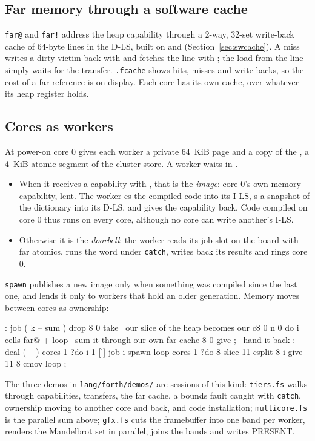 \subsection{Far memory through a software cache}
\texttt{far@} and \texttt{far!} address the heap capability through a 2-way, 32-set write-back cache of
64-byte lines in the D-LS, built on  and  (Section~\ref{sec:swcache}). A miss
writes a dirty victim back with  and fetches the line with ; the load from the
line simply waits for the transfer. \texttt{.fcache} shows hits, misses and write-backs, so the cost of
a far reference is on display. Each core has its own cache, over whatever its heap register holds.

\subsection{Cores as workers}
At power-on core 0 gives each worker a private 64~KiB page and a copy of the , a 4~KiB
atomic segment of the cluster store. A worker waits in .
\begin{itemize}
\item When it receives a capability with , that is the \emph{image}: core 0's own memory
  capability, lent. The worker es the compiled code into its I-LS, s a snapshot
  of the dictionary into its D-LS, and gives the capability back. Code compiled on core 0 thus runs on
  every core, although no core can write another's I-LS.
\item Otherwise it is the \emph{doorbell}: the worker reads its job slot on the board with far atomics,
  runs the word under \texttt{catch}, writes back its results and rings core 0.
\end{itemize}
\texttt{spawn} publishes a new image only when something was compiled since the last one, and lends it
only to workers that hold an older generation. Memory moves between cores as ownership:

\begin{shell}
: job ( k -- sum )  drop  8 0 take              \ our slice of the heap becomes our c8
  0  n 0 do  i cells far@ +  loop               \ sum it through our own far cache
  8 0 give ;                                    \ hand it back
: deal ( -- )  cores 1 ?do  i 1 ['] job i spawn  loop
  cores 1 ?do  8 slice 11 csplit  8 i give  11 8 cmov  loop ;
\end{shell}

The three demos in \texttt{lang/forth/demos/} are sessions of this kind: \texttt{tiers.fs} walks
through capabilities, transfers, the far cache, a bounds fault caught with \texttt{catch}, ownership
moving to another core and back, and code installation; \texttt{multicore.fs} is the parallel sum
above; \texttt{gfx.fs} cuts the framebuffer into one band per worker, renders the Mandelbrot set in
parallel, joins the bands and writes PRESENT.

